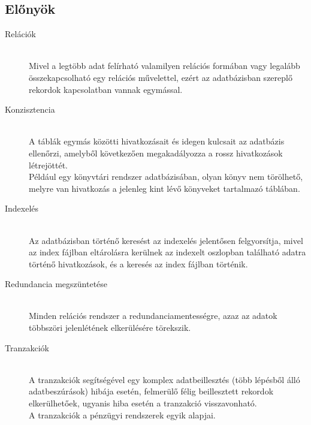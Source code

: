 \subsection{Előnyök}

\begin{description}
	\item[Relációk] \hfill \\
		Mivel a legtöbb adat felírható valamilyen relációs formában vagy legalább összekapcsolható egy relációs művelettel, ezért az adatbázisban szereplő rekordok kapcsolatban vannak egymással.
	\item[Konzisztencia] \hfill \\
		A táblák egymás közötti hivatkozásait és idegen kulcsait az adatbázis ellenőrzi, amelyből következően megakadályozza a rossz hivatkozások létrejöttét.\\
		Például egy könyvtári rendszer adatbázisában, olyan könyv nem törölhető, melyre van hivatkozás a jelenleg kint lévő könyveket tartalmazó táblában.
	\item[Indexelés] \hfill \\
		Az adatbázisban történő keresést az indexelés jelentősen felgyorsítja, mivel az index fájlban eltárolásra kerülnek az indexelt oszlopban található adatra történő hivatkozások, és a keresés az index fájlban történik.
	\item[Redundancia megszüntetése] \hfill \\
		Minden relációs rendszer a redundanciamentességre, azaz az adatok többszöri jelenlétének elkerülésére törekszik.
	\item[Tranzakciók] \hfill \\
		A tranzakciók segítségével egy komplex adatbeillesztés (több lépésből álló adatbeszúrások) hibája esetén, felmerülő félig beillesztett rekordok elkerülhetőek, ugyanis hiba esetén a tranzakció visszavonható. \\
		A tranzakciók a pénzügyi rendszerek egyik alapjai.

\end{description}

